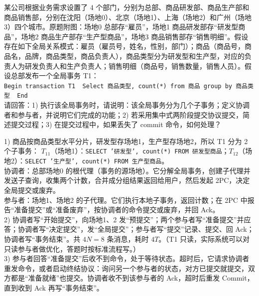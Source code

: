 \documentclass[10pt,a4paper]{article}
\newcommand{\zh}[1]{{\zhmono #1}}
\newenvironment{keep}{\par\noindent\begin{minipage}{\linewidth}\setlength{\parskip}{3pt plus 1pt}}{\end{minipage}\par\vspace{2pt}}
\begin{document}
\begin{keep}
\begin{prob}[2020 年第 4 题（9 分）]
某公司根据业务需求设置了 4 个部门，分别为总部、商品研发部、商品生产部和商品销售部，分别在沈阳（场地0）、北京（场地1）、上海（场地2）和广州（场地3）四个城市。原题附图：场地0 总部存“雇员”，场地1 商品研发部存“研发型商品”，场地2 商品生产部存“生产型商品”，场地3 商品销售部存“销售明细”。假设存在如下全局关系模式：雇员（雇员号，姓名，性别，部门）；商品（商品号，商品名，品牌，商品类型，商品负责人），商品类型分为研发型和生产型，对应的负责人为研发负责人和生产负责人；销售明细（商品号，销售数量，销售人员）。假设总部发布一个全局事务 T1：\\
\hspace*{1em}\texttt{Begin transaction T1\ \ Select \zh{商品类型}, count(*) from \zh{商品} group by \zh{商品类型}\ \ End}\\
请回答：1) 执行该全局事务时，请说明：该全局事务分为几个子事务；定义协调者和参与者，并说明它们完成的功能；2) 若采用集中式两阶段提交协议提交，简述提交过程；3) 在提交过程中，如果丢失了 commit 命令，如何处理？
\end{prob}
\begin{ans}[2020 年第 4 题]
1) 商品按商品类型水平分片，研发型存场地1，生产型存场地2，所以 T1 分为 2 个子事务：
$T_{11}$（场地1）：\texttt{SELECT '\zh{研发型}', count(*) FROM \zh{研发型商品}}；$T_{12}$（场地2）：\texttt{SELECT '\zh{生产型}', count(*) FROM \zh{生产型商品}}。\\
协调者：总部场地0 的根代理（事务的源场地）。它分解全局事务，创建子代理并发送子查询，收集两个计数，合并成分组结果返回给用户，然后发起 2PC，决定全局提交或废弃。\\
参与者：场地1、场地2 的子代理。它们执行本地子事务，返回计数；在 2PC 中报告“准备提交”或“准备废弃”，按协调者的命令提交或废弃，并回 Ack。\\
2) 协调者写“开始提交”，向场地1、2 发“预提交”；两个参与者写“准备提交”并应答；协调者写“决定提交”，发“全局提交”；参与者写“提交”记录、提交、回 Ack；协调者写“事务结束”。共 $4N=8$ 条消息，耗时 $4T$。（T1 只读，实际系统可以对只读参与者做优化，答题时按标准流程写。）\\
3) 参与者回答“准备提交”后收不到命令，处于等待状态。超时后，它请求协调者重发命令，或者启动终结协议：询问另一个参与者的状态，对方已提交就提交，双方都是“准备就绪”也提交。协调者收不到该参与者的 Ack，超时后重发 Commit，直到收到 Ack 再写“事务结束”。
\end{ans}
\end{keep}
\end{document}
